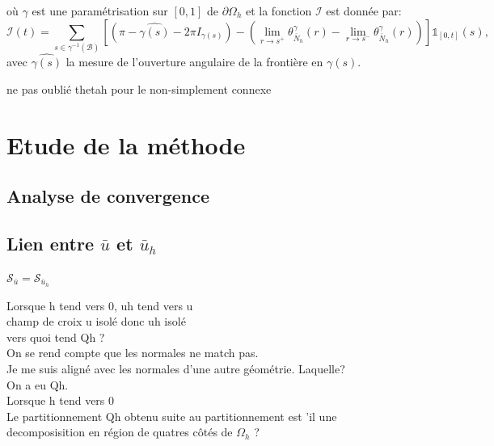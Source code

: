 où $\gamma$ est une paramétrisation sur $[0, 1]$ de $\partial\Omega_h$ et la fonction $\mathcal{I}$ est donnée par:
$$
\mathcal{I}(t)=\displaystyle\sum_{s\in\gamma^{-1}(\mathcal{B})}\left[\left(\pi-\widehat{\gamma(s)}-2\pi I_{\gamma(s)}\right)-\left(\displaystyle\lim\limits_{r\rightarrow s^+}\theta^{\gamma}_{\bar{N}_h}(r) - \lim\limits_{r\rightarrow s^-}\theta^{\gamma}_{\bar{N}_h}(r)\right)\right]\mathbb{1}_{[0, t]}(s),
$$
avec $\widehat{\gamma(s)}$ la mesure de l'ouverture angulaire de la frontière en $\gamma(s)$.

ne pas oublié thetah pour le non-simplement connexe


\section{Etude de la méthode}

\subsection{Analyse de convergence}


\subsection{Lien entre $\bar{u}$ et $\bar{u}_h$}

\begin{lemma}
    $\mathcal{S}_{\bar{u}}=\mathcal{S}_{\bar{u}_h}$
\end{lemma}

Lorsque h tend vers 0, uh tend vers u\\

champ de croix u isolé donc uh isolé\\

vers quoi tend Qh ?\\

On se rend compte que les normales ne match pas.\\

Je me suis aligné avec les normales d'une autre géométrie. Laquelle?\\

On a eu Qh. \\

Lorsque h tend vers 0\\

Le partitionnement Qh obtenu suite au partitionnement est 'il une decomposisition en région de quatres côtés de $\Omega_h$ ?\\

